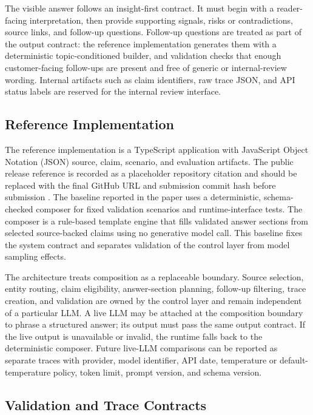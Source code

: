 The visible answer follows an insight-first contract. It must begin with a reader-facing interpretation, then provide supporting signals, risks or contradictions, source links, and follow-up questions. Follow-up questions are treated as part of the output contract: the reference implementation generates them with a deterministic topic-conditioned builder, and validation checks that enough customer-facing follow-ups are present and free of generic or internal-review wording. Internal artifacts such as claim identifiers, raw trace JSON, and API status labels are reserved for the internal review interface.

\subsection{Reference Implementation}
\label{sec:implementation-details}

The reference implementation is a TypeScript application with JavaScript Object Notation (JSON) source, claim, scenario, and evaluation artifacts. The public release reference is recorded as a placeholder repository citation and should be replaced with the final GitHub URL and submission commit hash before submission \citep{ahnkim2026advisorrepo}. The baseline reported in the paper uses a deterministic, schema-checked composer for fixed validation scenarios and runtime-interface tests. The composer is a rule-based template engine that fills validated answer sections from selected source-backed claims using no generative model call. This baseline fixes the system contract and separates validation of the control layer from model sampling effects.

The architecture treats composition as a replaceable boundary. Source selection, entity routing, claim eligibility, answer-section planning, follow-up filtering, trace creation, and validation are owned by the control layer and remain independent of a particular LLM. A live LLM may be attached at the composition boundary to phrase a structured answer; its output must pass the same output contract. If the live output is unavailable or invalid, the runtime falls back to the deterministic composer. Future live-LLM comparisons can be reported as separate traces with provider, model identifier, API date, temperature or default-temperature policy, token limit, prompt version, and schema version.

\subsection{Validation and Trace Contracts}


